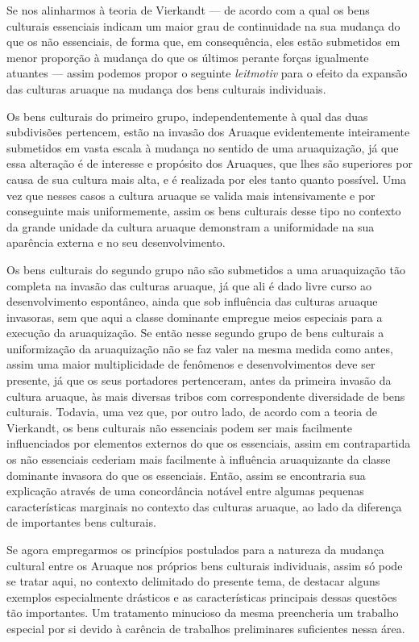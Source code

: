 Se nos alinharmos à teoria de Vierkandt --- de acordo com a qual os bens
culturais essenciais indicam um maior grau de continuidade na sua
mudança do que os não essenciais, de forma que, em consequência, eles
estão submetidos em menor proporção à mudança do que os últimos perante
forças igualmente atuantes --- assim podemos propor o seguinte
\textit{leitmotiv} para o efeito da expansão das culturas aruaque na
mudança dos bens culturais individuais.

Os bens culturais do primeiro grupo, independentemente à qual das duas
subdivisões pertencem, estão na invasão dos Aruaque evidentemente
inteiramente submetidos em vasta escala à mudança no sentido de uma
aruaquização, já que essa alteração é de interesse e propósito dos
Aruaques, que lhes são superiores por causa de sua cultura mais alta, e
é realizada por eles tanto quanto possível. Uma vez que nesses casos a
cultura aruaque se valida mais intensivamente e por conseguinte mais
uniformemente, assim os bens culturais desse tipo no contexto da grande
unidade da cultura aruaque demonstram a uniformidade na sua aparência
externa e no seu desenvolvimento.

Os bens culturais do segundo grupo não são submetidos a uma aruaquização
tão completa na invasão das culturas aruaque, já que ali é dado livre
curso ao desenvolvimento espontâneo, ainda que sob influência das
culturas aruaque invasoras, sem que aqui a classe dominante empregue
meios especiais para a execução da aruaquização. Se então nesse segundo
grupo de bens culturais a uniformização da aruaquização não se faz
valer na mesma medida como antes, assim uma maior multiplicidade de
fenômenos e desenvolvimentos deve ser presente, já que os seus
portadores pertenceram, antes da primeira invasão da cultura aruaque, às
mais diversas tribos com correspondente diversidade de bens culturais.
Todavia, uma vez que, por outro lado, de acordo com a teoria de
Vierkandt, os bens culturais não essenciais podem ser mais facilmente
influenciados por elementos externos do que os essenciais, assim em
contrapartida os não essenciais cederiam mais facilmente à influência
aruaquizante da classe dominante invasora do que os essenciais. Então,
assim se encontraria sua explicação através de uma concordância notável
entre algumas pequenas características marginais no contexto das
culturas aruaque, ao lado da diferença de importantes bens culturais.

Se agora empregarmos os princípios postulados para a natureza da
mudança cultural entre os Aruaque nos próprios bens culturais
individuais, assim só pode se tratar aqui, no contexto delimitado do
presente tema, de destacar alguns exemplos especialmente drásticos e as
características principais dessas questões tão importantes. Um
tratamento minucioso da mesma preencheria um trabalho especial por si
devido à carência de trabalhos preliminares suficientes nessa área.

